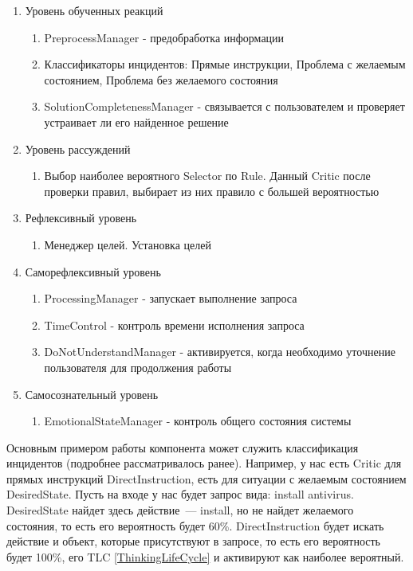 \begin{enumerate}
	\item Уровень обученных реакций
	\begin{enumerate}
		\item PreprocessManager - предобработка информации
		\item Классификаторы инцидентов: Прямые инструкции, Проблема с желаемым состоянием, Проблема без желаемого состояния
		\item SolutionCompletenessManager - связывается с пользователем и проверяет устраивает ли его найденное решение
	\end{enumerate}
	\item Уровень рассуждений
	\begin{enumerate}
		\item Выбор наиболее вероятного Selector по Rule. Данный Critic после проверки правил, выбирает из них правило с большей вероятностью
	\end{enumerate}
	\item Рефлексивный уровень
	\begin{enumerate}
		\item Менеджер целей. Установка целей
	\end{enumerate}
	\item Саморефлексивный уровень
	\begin{enumerate}
		\item ProcessingManager - запускает выполнение запроса
		\item TimeControl - контроль времени исполнения запроса
		\item DoNotUnderstandManager - активируется, когда необходимо уточнение пользователя для продолжения работы
	\end{enumerate}
	\item Самосознательный уровень
	\begin{enumerate}
		\item EmotionalStateManager - контроль общего состояния системы
	\end{enumerate} 
\end{enumerate} \par
Основным примером работы компонента может служить классификация инцидентов (подробнее рассматривалось ранее). Например, у нас есть Critic для прямых инструкций DirectInstruction, есть для ситуации с желаемым состоянием DesiredState. Пусть на входе у нас будет запрос вида: install antivirus. DesiredState найдет здесь действие~--- install, но не найдет желаемого состояния, то есть его вероятность будет 60\%. DirectInstruction будет искать действие и объект, которые присутствуют в запросе, то есть его вероятность будет 100\%, его TLC \ref{ThinkingLifeCycle} и активируют как наиболее вероятный. \par
